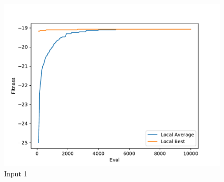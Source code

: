 \documentclass{standalone}
\begin{document}
\begin{figure}[!htb]
	\caption{Input 1}
	\label{fig:graph_1025}
	\includegraphics[width=\textwidth]{../graphs/graphs/1025.pdf}
\end{figure}
\end{document}
